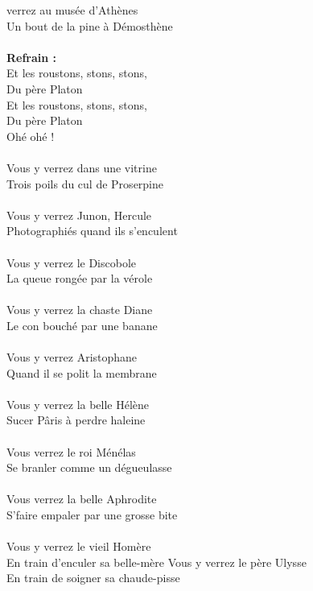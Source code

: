 
 verrez au musée d'Athènes
\\Un bout de la pine à Démosthène
\\\\\textbf{Refrain :}
\\Et les roustons, stons, stons,
\\Du père Platon
\\Et les roustons, stons, stons,
\\Du père Platon
\\Ohé ohé !
\\\\Vous y verrez dans une vitrine
\\Trois poils du cul de Proserpine
\\\\Vous y verrez Junon, Hercule
\\Photographiés quand ils s'enculent
\\\\Vous y verrez le Discobole
\\La queue rongée par la vérole
\\\\Vous y verrez la chaste Diane
\\Le con bouché par une banane
\\\\Vous y verrez Aristophane
\\Quand il se polit la membrane
\\\\Vous y verrez la belle Hélène
\\Sucer Pâris à perdre haleine
\\\\Vous verrez le roi Ménélas
\\Se branler comme un dégueulasse
\\\\Vous verrez la belle Aphrodite
\\S'faire empaler par une grosse bite
\\\\Vous y verrez le vieil Homère
\\En train d'enculer sa belle-mère
\breakpage
Vous y verrez le père Ulysse
\\En train de soigner sa chaude-pisse
